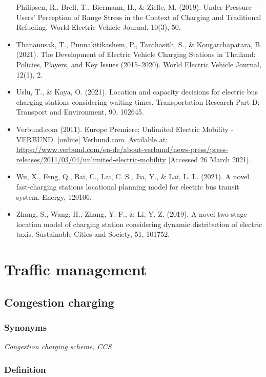 \documentclass[
]{book}
\begin{document}
\begin{itemize}
  Philipsen, R., Brell, T., Biermann, H., \& Ziefle, M. (2019). Under Pressure---Users' Perception of Range Stress in the Context of Charging and Traditional Refueling. World Electric Vehicle Journal, 10(3), 50.
\item
  Thananusak, T., Punnakitikashem, P., Tanthasith, S., \& Kongarchapatara, B. (2021). The Development of Electric Vehicle Charging Stations in Thailand: Policies, Players, and Key Issues (2015--2020). World Electric Vehicle Journal, 12(1), 2.
\item
  Uslu, T., \& Kaya, O. (2021). Location and capacity decisions for electric bus charging stations considering waiting times. Transportation Research Part D: Transport and Environment, 90, 102645.
\item
  Verbund.com (2011). Europe Premiere: Unlimited Electric Mobility - VERBUND. {[}online{]} Verbund.com. Available at: \url{https://www.verbund.com/en-de/about-verbund/news-press/press-releases/2011/03/04/unlimited-electric-mobility} {[}Accessed 26 March 2021{]}.
\item
  Wu, X., Feng, Q., Bai, C., Lai, C. S., Jia, Y., \& Lai, L. L. (2021). A novel fast-charging stations locational planning model for electric bus transit system. Energy, 120106.
\item
  Zhang, S., Wang, H., Zhang, Y. F., \& Li, Y. Z. (2019). A novel two-stage location model of charging station considering dynamic distribution of electric taxis. Sustainable Cities and Society, 51, 101752.
\end{itemize}

\hypertarget{traffic}{%
\chapter{Traffic management}\label{traffic}}

\hypertarget{congestion_charging}{%
\section{Congestion charging}\label{congestion_charging}}

\hypertarget{synonyms-5}{%
\subsection*{Synonyms}\label{synonyms-5}}

\emph{Congestion charging scheme, CCS}

\hypertarget{definition-6}{%
\subsection*{Definition}\label{definition-6}}
\end{document}

